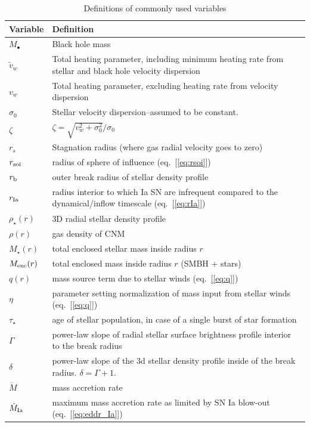 \documentclass[usenatbib,fleqn]{mn2e}
\begin{document}
\begin{table}
\begin{threeparttable}
\begin{minipage}{18cm}
\caption{Definitions of commonly used variables}
\begin{tabular}{ll}
\hline
{Variable} & {Definition} \\
\hline
$M_{\bullet}$ & Black hole mass \\
$\tilde{v}_{w}$ & Total heating parameter, including minimum heating
rate from stellar and black hole velocity dispersion \\
$v_{w}$ & Total heating parameter, excluding heating rate from
velocity dispersion \\
$\sigma_0$ & Stellar velocity dispersion--assumed to be constant.\\
$\zeta$ & $\zeta=\sqrt{v_w^2+\sigma_0^2}/\sigma_0$\\
$r_{s}$ & Stagnation radius (where gas radial velocity goes to zero) \\
$r_{\rm soi}$ & radius of sphere of influence (eq.~[\ref{eq:rsoi}]) \\
$r_{\rm b}$ & outer break radius of stellar density profile \\ 
$r_{\rm Ia}$ & radius interior to which Ia SN are infrequent compared to the dynamical/inflow timescale (eq.~[\ref{eq:rIa}]) \\ 
$\rho_{\star}(r)$ & 3D radial stellar density profile \\
$\rho(r)$ & gas density of CNM \\
$M_{\star}(r)$ & total enclosed stellar mass inside radius $r$ \\
$M_{\rm enc}(r)$ & total enclosed mass inside radius $r$ (SMBH + stars) \\
$q(r)$ & mass source term due to stellar winds (eq.~[\ref{eq:q}]) \\
$\eta$ & parameter setting normalization of mass input from stellar winds (eq.~[\ref{eq:q}]) \\
$\tau_{\star}$ & age of stellar population, in case of a single burst of star formation \\
$\Gamma$ & power-law slope of radial stellar surface brightness
profile interior to the break radius \\
$\delta$ & power-law slope of the 3d stellar density profile inside of
the break radius. $\delta=\Gamma+1$.\\
$\dot{M}$ & mass accretion rate \\
$\dot{M}_{\rm Ia}$ & maximum mass accretion rate as limited by SN Ia blow-out (eq.~[\ref{eq:eddr_Ia}]) \\

\end{tabular}
\end{minipage}
\end{threeparttable}
\end{table}
\end{document}
